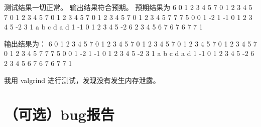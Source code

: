 \documentclass[UTF8]{ctexart}
\begin{document}
测试结果一切正常。
输出结果符合预期。
预期结果为
 6  0 1 2 3 4 5 7   0 1 2 3 4 5 7   0 1 2 3 4 5 7  0 1 2 3 4 5 7  0 1 2 3 4 5 7  0 1 2 3 4 5 7  7 7 5 0 0 1  -2 1 -1 0 1 2 3 4 5 -2 3  1\newline
a b c d a d 1  -1 0 1 2 3 4 5 -2  6  2 3 4 5 6 7  6 7 6 7 7 1 \newline

输出结果为：\newline
{}
 6  0 1 2 3 4 5 7   0 1 2 3 4 5 7   0 1 2 3 4 5 7  0 1 2 3 4 5 7  0 1 2 3 4 5 7  0 1 2 3 4 5 7  7 7 5 0 0 1  -2 1 -1 0 1 2 3 4 5 -2 3  1\newline
a b c d a d 1  -1 0 1 2 3 4 5 -2  6  2 3 4 5 6 7  6 7 6 7 7 1 \newline

我用 valgrind 进行测试，发现没有发生内存泄露。

\section{（可选）bug报告}
\end{document}
